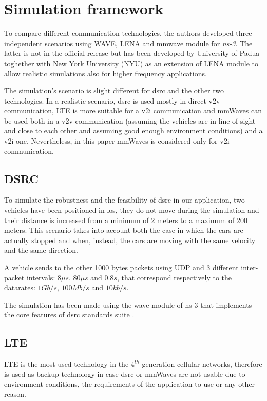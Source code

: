 
\section{Simulation framework}
\label{sec:simulation_framework}
To compare different communication technologies, the authors developed three independent scenarios using WAVE, LENA and mmwave module for \textit{ns-3}. The latter is not in the official release but has been developed by University of Padua toghether with New York University (NYU) as an extension of LENA module to allow realistic simulations also for higher frequency applications. 

The simulation's scenario is slight different for \gls{dsrc} and the other two technologies. In a realistic scenario, \gls{dsrc} is used mostly in direct \gls{v2v} communication, LTE is more suitable for a \gls{v2i} communication and \gls{mmWaves} can be used both in a \gls{v2v} communication (assuming the vehicles are in line of sight and close to each other and assuming good enough environment conditions) and a \gls{v2i} one.
Nevertheless, in this paper \gls{mmWaves} is considered only for \gls{v2i} communication.

\subsection{DSRC}
\label{sec:dsrc_model}
To simulate the robustness and the feasibility of \gls{dsrc} in our application, two vehicles have been positioned in \gls{los}, they do not move during the simulation and their distance is increased from a minimum of 2 meters to a maximum of 200 meters. This scenario takes into account both the case in which the cars are actually stopped and when, instead, the cars are moving with the same velocity and the same direction.

A vehicle sends to the other 1000 bytes packets using UDP and 3 different inter-packet intervals: $8\mu s$, $80\mu s$ and $0.8s$, that correspond respectively to the datarates: $1Gb/s$, $100Mb/s$ and $10kb/s$.

The simulation has been made using the \gls{wave} module of ns-3 that implements the core features of \gls{dsrc} standards suite \cite{WAVEStandard}.

\subsection{LTE}
LTE is the most used technology in the $4^{th}$ generation cellular networks, therefore is used as backup technology in case \gls{dsrc} or \gls{mmWaves} are not usable due to environment conditions, the requirements of the application to use or any other reason.

